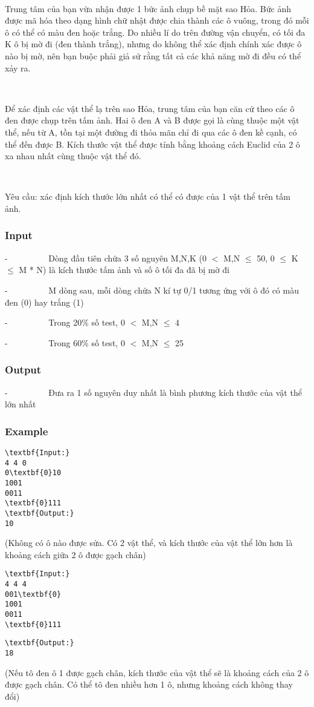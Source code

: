 

 

Trung tâm của bạn vừa nhận được 1 bức ảnh chụp bề mặt sao Hỏa. Bức ảnh được mã hóa theo dạng hình chữ nhật được chia thành các ô vuông, trong đó mỗi ô có thể có màu đen hoặc trắng. Do nhiều lí do trên đường vận chuyển, có tối đa K ô bị mờ đi (đen thành trắng), nhưng do không thể xác định chính xác được ô nào bị mờ, nên bạn buộc phải giả sử rằng tất cả các khả năng mờ đi đều có thể xảy ra.

 

Để xác định các vật thể lạ trên sao Hỏa, trung tâm của bạn căn cứ theo các ô đen được chụp trên tấm ảnh. Hai ô đen A và B được gọi là cùng thuộc một vật thể, nếu từ A, tồn tại một đường đi thỏa mãn chỉ đi qua các ô đen kề cạnh, có thể đến được B. Kích thước vật thể được tính bằng khoảng cách Euclid của 2 ô xa nhau nhất cùng thuộc vật thể đó.

 

Yêu cầu: xác định kích thước lớn nhất có thể có được của 1 vật thể trên tấm ảnh.

\subsubsection{Input}

-          Dòng đầu tiên chứa 3 số nguyên M,N,K (0 $<$ M,N  $\le$  50, 0  $\le$  K  $\le$  M * N) là kích thước tấm ảnh và số ô tối đa đã bị mờ đi

-          M dòng sau, mỗi dòng chứa N kí tự 0/1 tương ứng với ô đó có màu đen (0) hay trắng (1)

-          Trong 20\% số test, 0 $<$ M,N  $\le$  4

-          Trong 60\% số test, 0 $<$ M,N  $\le$  25

\subsubsection{Output}

-          Đưa ra 1 số nguyên duy nhất là bình phương kích thước của vật thể lớn nhất

\subsubsection{Example}
\begin{verbatim}
\textbf{Input:}
4 4 0
0\textbf{0}10
1001
0011
\textbf{0}111
\textbf{Output:}
10\end{verbatim}

(Không có ô nào được sửa. Có 2 vật thể, và kích thước của vật thể lớn hơn là khoảng cách giữa 2 ô được gạch chân)
\begin{verbatim}
\textbf{Input:}
4 4 4
001\textbf{0}
1001
0011
\textbf{0}111\end{verbatim}
\begin{verbatim}
\textbf{Output:}
18\end{verbatim}

(Nếu tô đen ô 1 được gạch chân, kích thước của vật thể sẽ là khoảng cách của 2 ô được gạch chân. Có thể tô đen nhiều hơn 1 ô, nhưng khoảng cách không thay đổi)

